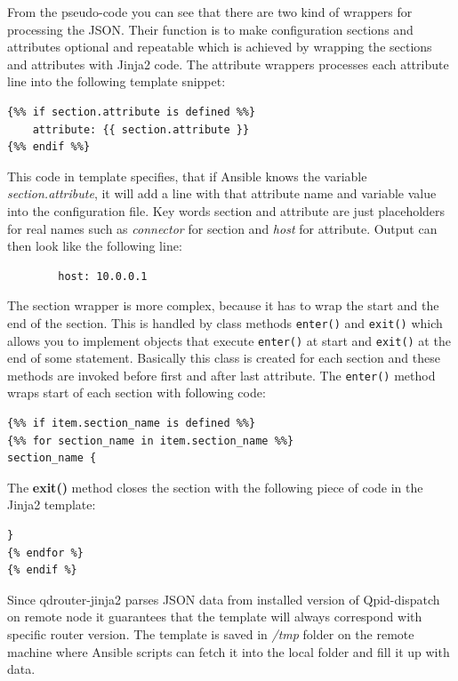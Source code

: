 From the pseudo-code you can see that there are two kind of wrappers for processing the JSON. Their function is to make configuration sections and attributes optional and repeatable which is achieved by wrapping the sections and attributes with Jinja2 code. The attribute wrappers processes each attribute line into the following template snippet:

\begin{verbatim}
{%% if section.attribute is defined %%}
    attribute: {{ section.attribute }}
{%% endif %%}
\end{verbatim}

This code in template specifies, that if Ansible knows the variable \emph{section.attribute}, it will add a line with that attribute name and variable value into the configuration file. Key words section and attribute are just placeholders for real names such as \emph{connector} for section and \emph{host} for attribute. Output can then look like the following line:

\begin{verbatim}
		host: 10.0.0.1
\end{verbatim}

The section wrapper is more complex, because it has to wrap the start and the end of the section. This is handled by class methods \texttt{\textunderscore enter\textunderscore ()} and \texttt{\textunderscore exit\textunderscore ()} which allows you to implement objects that execute \texttt{\textunderscore enter\textunderscore ()} at start and \texttt{\textunderscore exit\textunderscore ()} at the end of some statement. Basically this class is created for each section and these methods are invoked before first and after last attribute. The \texttt{\textunderscore enter\textunderscore ()} method wraps start of each section with following code:

\begin{verbatim}
{%% if item.section_name is defined %%}
{%% for section_name in item.section_name %%}
section_name {
\end{verbatim}

The \textbf{\textunderscore exit\textunderscore ()} method closes the section with the following piece of code in the Jinja2 template:
\begin{verbatim}
}
{% endfor %}
{% endif %}
\end{verbatim}

Since qdrouter-jinja2 parses JSON data from installed version of Qpid-dispatch on remote node it guarantees that the template will always correspond with specific router version. The template is saved in \emph{/tmp} folder on the remote machine where Ansible scripts can fetch it into the local folder and fill it up with data.

